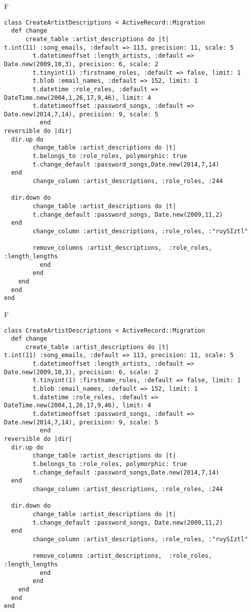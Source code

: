 F
\begin{verbatim}
class CreateArtistDescriptions < ActiveRecord::Migration
  def change
	  create_table :artist_descriptions do |t|
t.int(11) :song_emails, :default => 113, precision: 11, scale: 5
		t.datetimeoffset :length_artists, :default => Date.new(2009,10,3), precision: 6, scale: 2
		t.tinyint(1) :firstname_roles, :default => false, limit: 1
		t.blob :email_names, :default => 152, limit: 1
		t.datetime :role_roles, :default => DateTime.new(2004,1,26,17,9,46), limit: 4
		t.datetimeoffset :password_songs, :default => Date.new(2014,7,14), precision: 9, scale: 5
		  end
reversible do |dir|
  dir.up do
		change_table :artist_descriptions do |t|
		t.belongs_to :role_roles, polymorphic: true
 		t.change_default :password_songs,Date.new(2014,7,14)
  end
 		change_column :artist_descriptions, :role_roles, :244
   
  dir.down do
		change_table :artist_descriptions do |t|
		t.change_default :password_songs, Date.new(2009,11,2)
  end
 		change_column :artist_descriptions, :role_roles, :"ruySIztl"
   
		remove_columns :artist_descriptions,  :role_roles, :length_lengths 
	      end
	    end
    end 
  end
end

\end{verbatim}

F
\begin{verbatim}
class CreateArtistDescriptions < ActiveRecord::Migration
  def change
	  create_table :artist_descriptions do |t|
t.int(11) :song_emails, :default => 113, precision: 11, scale: 5
		t.datetimeoffset :length_artists, :default => Date.new(2009,10,3), precision: 6, scale: 2
		t.tinyint(1) :firstname_roles, :default => false, limit: 1
		t.blob :email_names, :default => 152, limit: 1
		t.datetime :role_roles, :default => DateTime.new(2004,1,26,17,9,46), limit: 4
		t.datetimeoffset :password_songs, :default => Date.new(2014,7,14), precision: 9, scale: 5
		  end
reversible do |dir|
  dir.up do
		change_table :artist_descriptions do |t|
		t.belongs_to :role_roles, polymorphic: true
 		t.change_default :password_songs,Date.new(2014,7,14)
  end
 		change_column :artist_descriptions, :role_roles, :244
   
  dir.down do
		change_table :artist_descriptions do |t|
		t.change_default :password_songs, Date.new(2009,11,2)
  end
 		change_column :artist_descriptions, :role_roles, :"ruySIztl"
   
		remove_columns :artist_descriptions,  :role_roles, :length_lengths 
	      end
	    end
    end 
  end
end

\end{verbatim}

